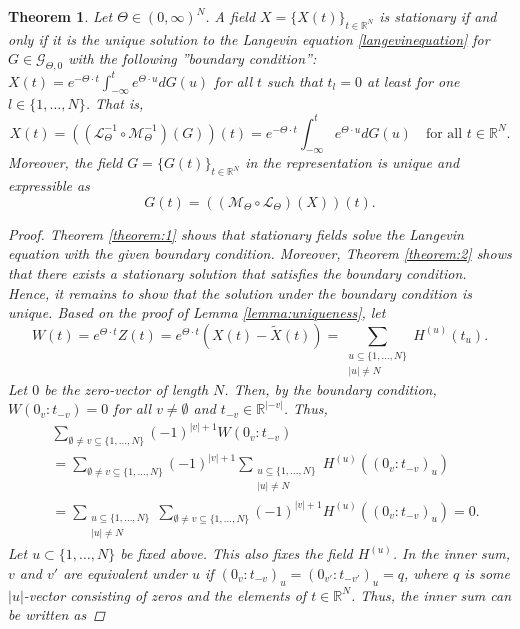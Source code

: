 \documentclass[english, a4paper, 12pt,reqno]{amsart}
\newtheorem{theorem}[defi]{Theorem}
\begin{document}
\begin{theorem}
\label{theorem:supreme}
Let $\Theta\in(0,\infty)^N$. A field $X = \{X(t)\}_{t\in\mathbb{R}^N}$ is stationary if and only if it is the unique solution to the Langevin equation \eqref{langevinequation} for $G\in\mathcal{G}_{\Theta,0}$ with the following ''boundary condition'': $X(t) = e^{-\Theta \cdot t}\int_{-\infty}^t e^{\Theta \cdot u} dG(u)$ for all $t$ such that $t_l=0$ at least for one $l\in\{1,\dots,N\}$. That is, 
$$X(t) = \left((\mathcal{L}_\Theta^{-1} \circ \mathcal{M}_\Theta^{-1} )(G)\right)(t) =  e^{-\Theta\cdot t}\int_{-\infty}^{t} e^{\Theta\cdot u} dG(u)\quad\text{for all } t\in\mathbb{R}^N.$$
Moreover, the field $G = \{G(t)\}_{t\in\mathbb{R}^N}$ in the representation is unique and expressible as
$$G(t) = \left(( \mathcal{M}_\Theta \circ \mathcal{L}_\Theta)(X)\right)(t).$$
\begin{proof}
Theorem \ref{theorem:1} shows that stationary fields solve the Langevin equation with the given boundary condition. Moreover, Theorem \ref{theorem:2} shows that there exists a stationary solution that satisfies the boundary condition. Hence, it remains to show that the solution under the boundary condition is unique. Based on the proof of Lemma \ref{lemma:uniqueness}, let 
\begin{equation*}
W(t) = e^{\Theta\cdot t}Z(t) = e^{\Theta\cdot t}(X(t)- \tilde{X}(t)) =  \sum_{\substack{u\subseteq \{1,\dots,N\}\\
|u| \neq N}}H^{(u)}(t_u). 
\end{equation*}
Let $0$ be the zero-vector of length $N$. Then, by the boundary condition, $W(0_v:t_{-v}) = 0$ for all $v\neq \emptyset$ and $t_{-v}\in\mathbb{R}^{|-v|}$. Thus,
\begin{equation*}
\begin{split}
&\sum_{\emptyset\neq v\subseteq \{1,\dots,N\}} (-1)^{|v|+1} W(0_v:t_{-v})\\ &= \sum_{\emptyset\neq v \subseteq \{1,\dots,N\}} (-1)^{|v|+1}\sum_{\substack{u\subseteq \{1,\dots,N\}\\
|u| \neq N}}H^{(u)}((0_v:t_{-v})_u)\\
&= \sum_{\substack{u\subseteq \{1,\dots,N\}\\
|u| \neq N}} \sum_{\emptyset\neq v \subseteq \{1,\dots,N\}}(-1)^{|v|+1}H^{(u)}((0_v:t_{-v})_u)=0.
\end{split}
\end{equation*}
Let $u\subset \{1,\dots,N\}$ be fixed above. This also fixes the field $H^{(u)}$. In the inner sum, $v$ and $v'$ are equivalent under $u$ if $(0_v:t_{-v})_u = (0_{v'}:t_{-v'})_u = q$, where $q$ is some $|u|$-vector consisting of zeros and the elements of $t\in\mathbb{R}^N$. Thus, the inner sum can be written as

\end{proof}
\end{theorem}
\end{document}
